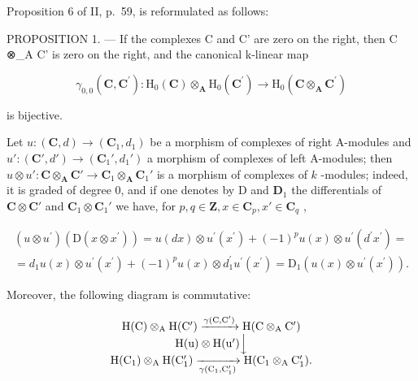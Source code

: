 Proposition 6 of II, p.~59, is reformulated as follows:

PROPOSITION 1. --- If the complexes C and C' are zero on the right, then C ⊗\_A C' is zero on the right, and the canonical k-linear map

\[
\gamma_ {0, 0} (\mathbf {C}, \mathbf {C} ^ {\prime}): \mathrm{H} _ {0} (\mathbf {C}) \otimes_ {\mathbf {A}} \mathrm{H} _ {0} (\mathbf {C} ^ {\prime}) \rightarrow \mathrm{H} _ {0} (\mathbf {C} \otimes_ {\mathbf {A}} \mathbf {C} ^ {\prime})
\]

is bijective.

Let \(u: (\mathbf{C}, d) \to (\mathbf{C}_1, d_1)\) be a morphism of complexes of right A-modules and \(u': (\mathbf{C}', d') \to (\mathbf{C}_1', d_1')\) a morphism of complexes of left A-modules; then \(u \otimes u': \mathbf{C} \otimes_{\mathbf{A}} \mathbf{C}' \to \mathbf{C}_1 \otimes_{\mathbf{A}} \mathbf{C}_1'\) is a morphism of complexes of \(k\) -modules; indeed, it is graded of degree 0, and if one denotes by D and \(\mathbf{D}_1\) the differentials of \(\mathbf{C} \otimes \mathbf{C}'\) and \(\mathbf{C}_1 \otimes \mathbf{C}_1'\) we have, for \(p, q \in \mathbf{Z}, x \in \mathbf{C}_p, x' \in \mathbf{C}_q\) ,

\[
\begin{array}{c} (u \otimes u ^ {\prime}) (\mathrm{D} (x \otimes x ^ {\prime})) = u (d x) \otimes u ^ {\prime} (x ^ {\prime}) + (- 1) ^ {p} u (x) \otimes u ^ {\prime} (d ^ {\prime} x ^ {\prime}) = \\ = d _ {1} u (x) \otimes u ^ {\prime} (x ^ {\prime}) + (- 1) ^ {p} u (x) \otimes d _ {1} ^ {\prime} u ^ {\prime} (x ^ {\prime}) = \mathrm{D} _ {1} (u (x) \otimes u ^ {\prime} (x ^ {\prime}))  . \end{array}
\]

Moreover, the following diagram is commutative:

\[
\begin{array}{c} \mathrm{H(C)} \otimes_ {\mathrm{A}} \mathrm {H(C^ {\prime})} \xrightarrow {\gamma (\mathrm{C,C} ^ {\prime})} \mathrm{H(C} \otimes_ {\mathrm{A}} \mathrm {C^ {\prime}}) \\ \mathrm{H(u)} \otimes \mathrm {H(u^{\prime})} \Big \downarrow \\ \mathrm {H(C_ {1})} \otimes_ {\mathrm{A}} \mathrm {H(C_ {1} ^ {\prime})} \xrightarrow [ \gamma (\mathrm {C_ {1}} , \mathrm {C_ {1} ^ {\prime}}) ]{} \mathrm {H(C_ {1}} \otimes_ {\mathrm{A}} \mathrm {C_ {1} ^ {\prime}}). \end{array}
\]

